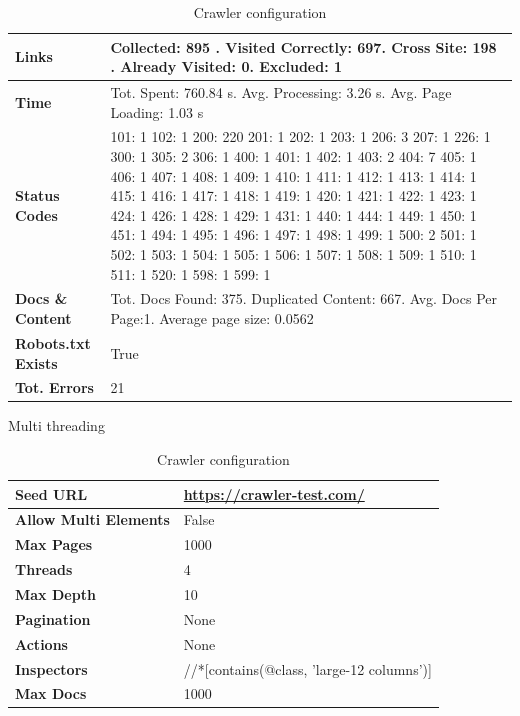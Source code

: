 {\begin{table}[ht] 
{\footnotesize
\begin{tabular}{ P{3cm} ||P{10.1cm}  }      %
 \hline \hline
\textbf{Links} & Collected: 895 . Visited Correctly: 697. Cross Site: 198 . Already Visited: 0. Excluded: 1\T\B 
\\ 
\hline
\textbf{Time} & Tot. Spent: 760.84 s. Avg. Processing: 3.26 s. Avg. Page Loading: 1.03 s\T\B 
\\
\hline
\textbf{Status Codes} &     101: 1  102: 1  200: 220  201: 1  202: 1  203: 1  206: 3  207: 1  226: 1  300: 1  305: 2  306: 1  400: 1  401: 1  402: 1  403: 2  404: 7  405: 1  406: 1  407: 1  408: 1  409: 1  410: 1  411: 1  412: 1  413: 1  414: 1  415: 1  416: 1  417: 1  418: 1  419: 1  420: 1  421: 1  422: 1  423: 1  424: 1  426: 1  428: 1  429: 1  431: 1  440: 1  444: 1  449: 1  450: 1  451: 1  494: 1  495: 1  496: 1  497: 1  498: 1  499: 1  500: 2  501: 1  502: 1  503: 1  504: 1  505: 1  506: 1  507: 1  508: 1  509: 1  510: 1  511: 1  520: 1  598: 1  
599: 1\T\B 
\\ 
\hline
\textbf{Docs \& Content} & Tot. Docs Found: 375. Duplicated Content: 667. Avg. Docs Per Page:1. Average page size: 0.0562\T\B 
\\ 
\hline
\textbf{Robots.txt Exists} & True\T\B 
\\ 
\hline
\textbf{Tot. Errors} & 21\T\B 
\\ 
\hline \hline
    \end{tabular}
}
  \captionsetup{justification=centering,margin=2cm}
  \caption{Crawler configuration}
\end{table}


Multi threading


\begin{table}[ht] 
{\footnotesize
\begin{tabular}{ P{3cm} ||P{10.1cm}  }      %
 \hline \hline
\textbf{Seed URL} & \href{https://crawler-test.com/}{https://crawler-test.com/}\T\B 
\\ 
\hline
\textbf{Allow Multi Elements} & False \T\B 
\\ 
\hline
\textbf{Max Pages} & 1000\T\B 
\\ 
\hline
\textbf{Threads} & 4\T\B 
\\ 
\hline
\textbf{Max Depth} & 10\T\B 
\\ 
\hline
\textbf{Pagination} & None\T\B 
\\ 
\hline
\textbf{Actions} & None\T\B 
\\ 
\hline
\textbf{Inspectors} & //*[contains(@class, 'large-12 columns')]\T\B 
\\ 
\hline
\textbf{Max Docs} & 1000\T\B 
\\ 
\hline \hline
    \end{tabular}
}
  \captionsetup{justification=centering,margin=2cm}
  \caption{Crawler configuration}
\end{table}



}
